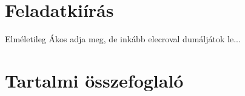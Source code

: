 \documentclass[12pt]{report}
\theoremstyle{definition}
\begin{document}
    \onehalfspacing




    \tableofcontents




    \chapter*{Feladatkiírás}

Elméletileg Ákos adja meg, de inkább elecroval dumáljátok le...



    \chapter*{Tartalmi összefoglaló}

\end{document}

